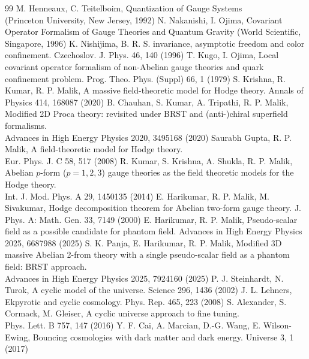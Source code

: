 \documentclass[12pt]{article}
\begin{document}
{\begin{thebibliography}{99}
 M. Henneaux, C. Teitelboim, Quantization of Gauge Systems \\(Princeton University, New Jersey, 1992)
 N. Nakanishi, I. Ojima, Covariant Operator Formalism of Gauge Theories and Quantum Gravity (World Scientific, Singapore, 1996)
 K. Nishijima, B. R. S. invariance, asymptotic freedom and color confinement. Czechoslov. J. Phys. 46, 140 (1996)
 T. Kugo, I. Ojima, Local covariant operator formalism of non-Abelian gauge theories and quark confinement problem.
                 Prog. Theo. Phys. (Suppl) 66, 1 (1979) 
 S. Krishna, R. Kumar, R. P. Malik, A massive field-theoretic model for Hodge theory. Annals of  Physics 414, 168087 (2020)
  B. Chauhan, S. Kumar, A. Tripathi, R. P. Malik, Modified 2D Proca theory: revisited under BRST and (anti-)chiral superfield formalisms. \\
                Advances in High Energy Physics 2020, 3495168 (2020)
 Saurabh Gupta, R. P. Malik, A field-theoretic model for Hodge theory. \\Eur. Phys. J. C 58, 517 (2008)                
 R. Kumar, S. Krishna, A. Shukla, R. P. Malik, Abelian $p$-form ($p = 1, 2, 3$) gauge theories as the field theoretic models for the Hodge theory.\\
                 Int. J. Mod. Phys. A 29, 1450135 (2014)
 E. Harikumar, R. P. Malik, M. Sivakumar, Hodge decomposition theorem for Abelian two-form gauge theory.
                 J. Phys. A: Math. Gen. 33,  7149 (2000)
 E. Harikumar, R. P. Malik, Pseudo-scalar field as a possible candidate for phantom field.
                 Advances in High Energy Physics 2025, 6687988 (2025) 
  S. K. Panja, E. Harikumar, R. P. Malik, Modified 3D massive Abelian 2-from theory with a single 
                  pseudo-scalar field as a phantom field: BRST approach. \\Advances in High Energy Physics 2025, 7924160  (2025)
 P. J. Steinhardt, N. Turok, A cyclic model of the universe. Science 296, 1436 (2002)
  J. L. Lehners, Ekpyrotic and cyclic cosmology. Phys. Rep. 465, 223 (2008)                  
   S. Alexander, S. Cormack, M. Gleiser, A cyclic universe approach to fine tuning.\\ Phys. Lett. B 757, 147 (2016) 
 Y. F. Cai, A. Marcian, D.-G. Wang, E. Wilson-Ewing, Bouncing cosmologies with dark matter and dark energy. Universe 3, 1 (2017)

\end{thebibliography}}
\end{document}
